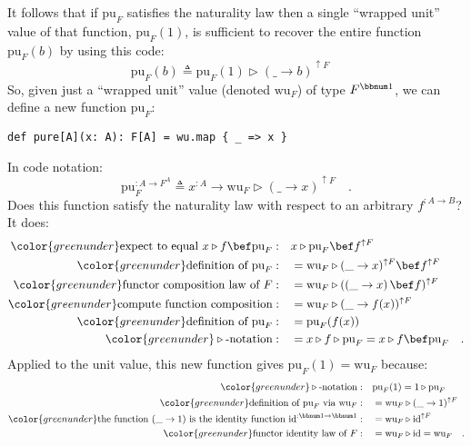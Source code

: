 It follows that if $\text{pu}_{F}$ satisfies the naturality law then
a single \textsf{``}wrapped unit\textsf{''} value of that function, $\text{pu}_{F}(1)$,
is sufficient to recover the entire function $\text{pu}_{F}(b)$ by
using this code:
\[
\text{pu}_{F}(b)\triangleq\text{pu}_{F}(1)\triangleright(\_\rightarrow b)^{\uparrow F}\quad
\]
So, given just a \textsf{``}wrapped unit\textsf{''} value (denoted $\text{wu}_{F}$)
of type $F^{\bbnum 1}$, we can define a new function $\text{pu}_{F}$:
\begin{lstlisting}
def pure[A](x: A): F[A] = wu.map { _ => x }
\end{lstlisting}
In code notation:
\begin{equation}
\text{pu}_{F}^{:A\rightarrow F^{A}}\triangleq x^{:A}\rightarrow\text{wu}_{F}\triangleright(\_\rightarrow x)^{\uparrow F}\quad.\label{eq:pu-via-wu-def}
\end{equation}
Does this function satisfy the naturality law with respect to an arbitrary
$f^{:A\rightarrow B}$? It does:
\begin{align*}
{\color{greenunder}\text{expect to equal }x\triangleright f\bef\text{pu}_{F}:}\quad & x\triangleright\text{pu}_{F}\bef f^{\uparrow F}\\
{\color{greenunder}\text{definition of }\text{pu}_{F}:}\quad & =\text{wu}_{F}\triangleright(\_\rightarrow x)^{\uparrow F}\bef f^{\uparrow F}\\
{\color{greenunder}\text{functor composition law of }F:}\quad & =\text{wu}_{F}\triangleright(\left(\_\rightarrow x\right)\bef f)^{\uparrow F}\\
{\color{greenunder}\text{compute function composition}:}\quad & =\text{wu}_{F}\triangleright(\_\rightarrow f(x))^{\uparrow F}\\
{\color{greenunder}\text{definition of }\text{pu}_{F}:}\quad & =\text{pu}_{F}(f(x))\\
{\color{greenunder}\triangleright\text{-notation}:}\quad & =x\triangleright f\triangleright\text{pu}_{F}=x\triangleright f\bef\text{pu}_{F}\quad.
\end{align*}
Applied to the unit value, this new function gives $\text{pu}_{F}(1)=\text{wu}_{F}$
because:
\begin{align*}
{\color{greenunder}\triangleright\text{-notation}:}\quad & \text{pu}_{F}(1)=1\triangleright\text{pu}_{F}\\
{\color{greenunder}\text{definition of }\text{pu}_{F}\text{ via }\text{wu}_{F}:}\quad & =\text{wu}_{F}\triangleright(\_\rightarrow1)^{\uparrow F}\\
{\color{greenunder}\text{the function }(\_\rightarrow1)\text{ is the identity function }\text{id}^{:\bbnum 1\rightarrow\bbnum 1}:}\quad & =\text{wu}_{F}\triangleright\text{id}^{\uparrow F}\\
{\color{greenunder}\text{functor identity law of }F:}\quad & =\text{wu}_{F}\triangleright\text{id}=\text{wu}_{F}\quad.
\end{align*}

